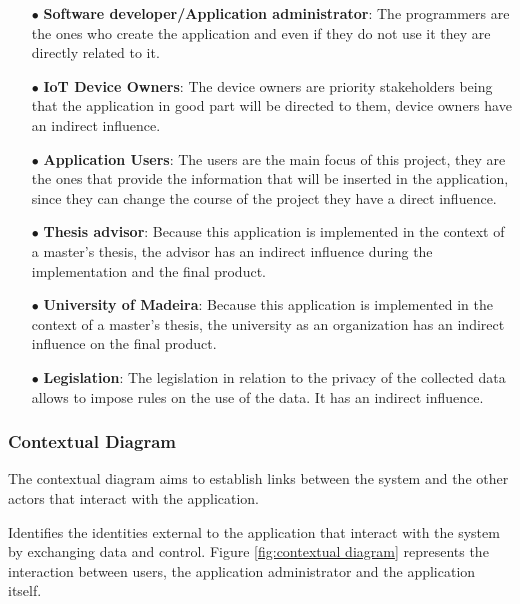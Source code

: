 \begin{itemize}
    \item[$\bullet$] \textbf{Software developer/Application administrator}: The programmers are the ones who create the application and even if they do not use it they are directly related to it.
    \item[$\bullet$] \textbf{IoT Device Owners}: The device owners are priority stakeholders being that the application in good part will be directed to them, device owners have an indirect influence.
    \item[$\bullet$] \textbf{Application Users}: The users are the main focus of this project, they are the ones that provide the information that will be inserted in the application, since they can change the course of the project they have a direct influence.
    \item[$\bullet$] \textbf{Thesis advisor}: Because this application is implemented in the context of a master's thesis, the advisor has an indirect influence during the implementation and the final product.
    \item[$\bullet$] \textbf{University of Madeira}: Because this application is implemented in the context of a master's thesis, the university as an organization has an indirect influence on the final product.
    \item[$\bullet$] \textbf{Legislation}: The legislation in relation to the privacy of the collected data allows to impose rules on the use of the data. It has an indirect influence.
\end{itemize}

\subsubsection{Contextual Diagram}

The contextual diagram aims to establish links between the system
and the other actors that interact with the application.

Identifies the identities external to the application that interact with
the system by exchanging data and control.
Figure \ref{fig:contextual diagram} represents the interaction between users, the
application administrator and the application itself.

